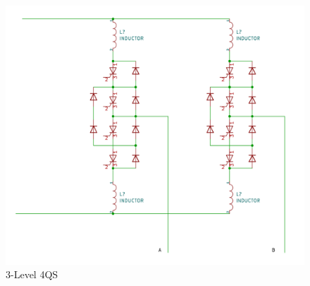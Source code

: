 \begin{figure}[!tbp]
    \centering
    \begin{minipage}[b]{0.5\textwidth}
        \includegraphics[width=\textwidth,frame]{Bilder/umrichter_schaltbild.png}
      \caption{3-Level 4QS}
    \end{minipage}
    \hfill
    \begin{minipage}[b]{0.4\textwidth}

\end{minipage}
\end{figure}

